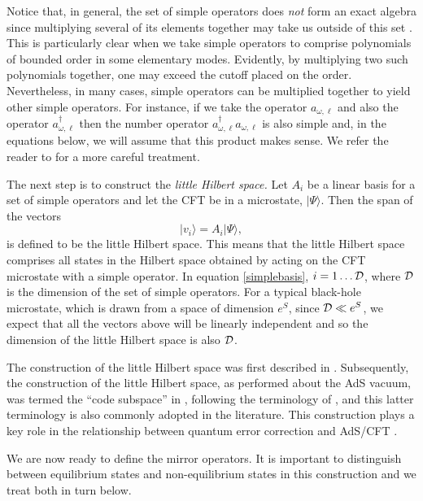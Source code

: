 \documentclass[12pt]{article}
\newcommand{\cop}[1]{#1}
\newcommand{\al}{\cop{A}} %
\newcommand{\be}{\begin{equation}}
\newcommand{\ee}{\end{equation}}
\begin{document}
Notice that, in general, the set of simple operators does {\em not} form an exact algebra since multiplying several of its elements together may take us outside of this set \cite{Ghosh:2017gtw}. This is particularly clear when we take simple operators to comprise polynomials of bounded order in some elementary modes. Evidently, by multiplying two such polynomials together, one may exceed the cutoff placed on the order. Nevertheless, in many cases, simple operators can be multiplied together to yield other simple operators. For instance, if we take the operator $a_{\omega, \ell}$ and also the operator $a_{\omega, \ell}^{\dagger}$ then the number operator $a_{\omega, \ell}^{\dagger} a_{\omega, \ell}$ is also simple and, in the equations below, we will assume that this product makes sense. We refer the reader to \cite{Papadodimas:2013jku,Papadodimas:2013wnh} for a more careful treatment.


The next step is to construct the {\em little Hilbert space.}  Let $\al_i$  be a linear basis for  a set of simple operators and let the CFT be in a microstate, $|\Psi \rangle$. Then the span of the  vectors
\be
\label{simplebasis}
|v_i \rangle = \al_i |\Psi \rangle,
\ee
is defined to be the little Hilbert space. This means that the little Hilbert space comprises all states in the Hilbert space obtained by acting on the CFT microstate with a simple operator.  In equation \eqref{simplebasis}, $i = 1 \ldots {\cal D}$, where ${\cal D}$ is the dimension of the set of simple operators. For a typical black-hole microstate, which is drawn from a space of dimension $e^{S}$, since ${\cal D} \ll e^{S}$, we expect that all the vectors above will be linearly independent and so the dimension of the little Hilbert space is also ${\cal D}$.

The construction of the little Hilbert space was first described in \cite{Papadodimas:2013jku}. Subsequently, the construction of the little Hilbert space, as performed about the AdS vacuum,  was termed the ``code subspace'' in \cite{Almheiri:2014lwa}, following the terminology of \cite{Verlinde:2012cy}, and this latter terminology is also commonly adopted in the literature. This construction plays a key role in the relationship between quantum error correction and AdS/CFT \cite{Pastawski:2015qua}.

We are now ready to define the mirror operators. It is important to distinguish between  equilibrium states and non-equilibrium states in this construction and we treat both in turn below.
\end{document}
